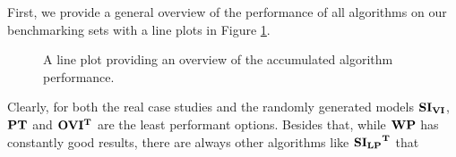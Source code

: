 First, we provide a general overview of the performance of all algorithms on our benchmarking sets with a line plots in Figure \ref{fig:AlgoPerformance}.
\begin{figure}[h!]
    \centering
    \qquad
    \qquad
    \caption[Overview of Algorithm Performance]{
        A line plot providing an overview of the accumulated algorithm performance.
        }%
    \label{fig:AlgoPerformanceBig}
    \label{fig:AlgoPerformance}
\end{figure}


Clearly, for both the real case studies and the randomly generated models $\mathbf{SI_{VI}}$, $\mathbf{PT}$ and $\mathbf{OVI^T}$ are the least performant options.
Besides that, while $\mathbf{WP}$ has constantly good results, there are always other algorithms like $\mathbf{\mathbf{SI_{LP}}^T}$ that 

